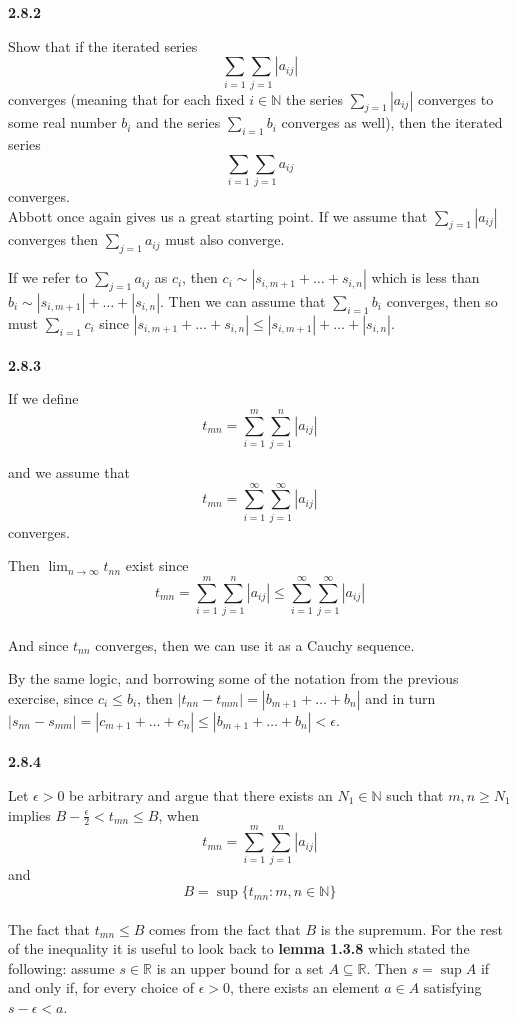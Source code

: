 \textbf{2.8.2}

Show that if the iterated series
$$
\sum_{i=1} \sum_{j=1} \left| a_{ij} \right|
$$
converges (meaning that for each fixed $i\in\mathbb{N}$ the series $\sum_{j=1} |a_{ij}|$ converges
to some real number $b_i$ and the series $\sum_{i=1} b_i$ converges as well),
then the iterated series
$$
\sum_{i=1} \sum_{j=1} a_{ij}
$$
converges.
\\

Abbott once again gives us a great starting point.
If we assume that $\sum_{j=1} |a_{ij}|$ converges then $\sum_{j=1} a_{ij}$ must also converge.

If we refer to $\sum_{j=1} a_{ij}$ as $c_i$, then $c_i \sim |s_{i,m+1} + \ldots + s_{i,n}|$
which is less than $b_i \sim |s_{i,m+1}| + \ldots + |s_{i,n}|$.
Then we can assume that $\sum_{i=1} b_i$ converges, then so must $\sum_{i=1} c_i$ since
$|s_{i,m+1} + \ldots + s_{i,n}| \leq |s_{i,m+1}| + \ldots + |s_{i,n}|$.
\\~\\


\textbf{2.8.3}

If we define
$$
t_{mn} = \sum^{m}_{i=1} \sum^{n}_{j=1} |a_{ij}|
$$

and we assume that
$$
t_{mn} = \sum^{\infty}_{i=1} \sum^{\infty}_{j=1} |a_{ij}|
$$
converges.

Then $\lim_{n\rightarrow\infty} t_{nn}$ exist since
$$
t_{mn} = \sum^{m}_{i=1} \sum^{n}_{j=1} |a_{ij}|
\leq
\sum^{\infty}_{i=1} \sum^{\infty}_{j=1} |a_{ij}|
$$
\\

And since $t_{nn}$ converges, then we can use it as a Cauchy sequence.

By the same logic, and borrowing some of the notation from the previous exercise,
since $c_i \leq b_i$, then $|t_{nn} - t_{mm}| = |b_{m+1} + \ldots + b_n|$
and in turn $|s_{nn} - s_{mm}| = |c_{m+1} +\ldots + c_{n}| \leq |b_{m+1} + \ldots + b_n| < \epsilon$.
\\~\\



\textbf{2.8.4}

Let $\epsilon>0$ be arbitrary and argue that there exists an $N_1 \in \mathbb{N}$
such that $m,n \geq N_1$ implies $B - \frac{\epsilon}{2} < t_{mn} \leq B$,
when
$$
t_{mn} = \sum^{m}_{i=1} \sum^{n}_{j=1} |a_{ij}|
$$
and
$$
B = \sup\{ t_{mn} : m,n\in\mathbb{N} \}
$$
\\

The fact that $t_{mn} \leq B$ comes from the fact that $B$ is the supremum.
For the rest of the inequality it is useful to look back to \textbf{lemma 1.3.8} which stated
the following: assume $s\in\mathbb{R}$ is an upper bound for a set $A\subseteq\mathbb{R}$.
Then $s = \sup A$ if and only if, for every choice of $\epsilon >0$, there exists an element
$a\in A$ satisfying $s - \epsilon < a$.
\\

